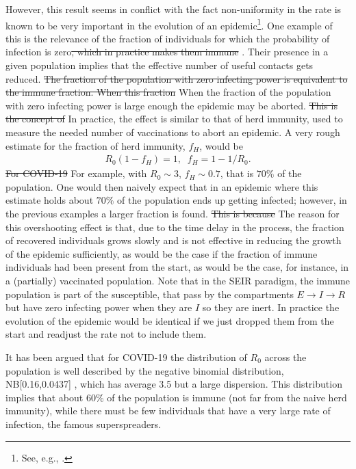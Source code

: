 \documentclass[10pt,letterpaper]{article}
\newcommand{\mychange}[2]{\textcolor[rgb]{0.75,0,0}{\st{#1} {#2}}}
\begin{document}
 However, this result seems in conflict with the fact non-uniformity in the rate is known to be very important in the evolution of an epidemic\footnote{See, e.g., \cite{Keeling2005,Bansal2007}.}. One example of this is the relevance of the fraction of individuals for which the probability of infection is zero\mychange{, which in practice makes them immune}{}. Their presence in a given population implies that the effective number of useful contacts gets reduced. \mychange{The fraction of the population with zero infecting power is equivalent to the immune fraction. When this fraction}{When the fraction of the population with zero infecting power} is large enough  the epidemic may be aborted. \mychange{This is the concept of}{In practice, the effect is similar to that of} herd immunity, used to measure the needed number of vaccinations to abort an epidemic. A very rough estimate for the fraction of herd immunity, $f_H$, would be
   \begin{eqnarray}
  R_0 (1- f_H)  =1, \;\; f_H= 1-1/R_0.
   \end{eqnarray}
   \mychange{For COVID-19}{For example}, with $R_0 \sim 3$, $f_H \sim 0.7$, that is $70\%$ of the population. {One would then naively expect that in an epidemic where this estimate holds about $70\%$ of the population ends up getting infected; however, in the previous examples a larger fraction is found.} \mychange{This is because}{The reason for this overshooting effect is that}, due to the time delay in the process, the fraction of recovered individuals grows slowly and is not effective in reducing the growth of the epidemic sufficiently, as would be the case if the fraction of immune individuals {had been present} from the start, as would be the case, for instance, in a (partially) vaccinated population. Note that in the SEIR paradigm, the immune population is part of the susceptible, that pass by the compartments $E\rightarrow I \rightarrow R$ but have zero infecting power when they are $I$ so they are inert. In practice the evolution of the epidemic would be identical if we just dropped them from the start and readjust the rate not to include them. 
 
  It has been argued that for COVID-19 the distribution of $R_0$ across the population is well described by the negative binomial distribution, NB[0.16,0.0437] \cite{LloydSmithNovember2020}, which has average 3.5 but a large dispersion. This distribution implies that about $60\%$ of the population is immune  (not far from the naive herd immunity), while there must be few individuals that have a very large rate of infection, the famous superspreaders.
\end{document}
